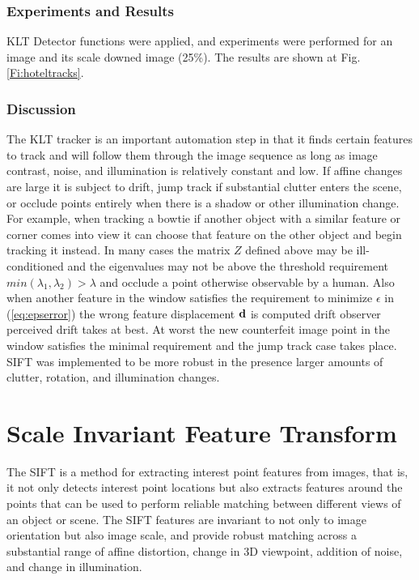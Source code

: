 \documentclass{article}
\begin{document}
\subsubsection{Experiments and Results}

KLT Detector functions were applied, and experiments were performed for an image and its scale downed image (25\%).
The results are shown at Fig. \ref{Fi:hoteltracks}. 

\subsubsection{Discussion}
The KLT tracker is an important automation step in that it finds certain features to track and will follow them through the image sequence as long as image contrast, noise, and illumination is relatively constant and low.  If affine changes are large it is subject to drift, jump track if substantial clutter enters the scene, or occlude points entirely when there is a shadow or other illumination change.  For example, when tracking a bowtie if another object with a similar feature or corner comes into view it can choose that feature on the other object and begin tracking it instead. In many cases the matrix $Z$ defined above may be ill-conditioned and the eigenvalues may not be above the threshold requirement $min(\lambda_1,\lambda_2) > \lambda$ and occlude a point otherwise  observable by a human.  Also when another feature in the window satisfies the requirement to minimize $\epsilon$ in (\ref{eq:epserror}) the wrong feature displacement $\bf d$ is computed drift observer perceived drift takes at best. At worst the new counterfeit image point in the window satisfies the minimal requirement and the jump track case takes place.  SIFT was implemented to be more robust in the presence larger amounts of clutter, rotation, and illumination changes. 

\section{Scale Invariant Feature Transform}\label{S:SIFT}

The SIFT \cite{dLowe04} is a method for extracting interest point features from images, that is, 
it not only detects interest point locations but also extracts features around the points that can be used to perform reliable matching between different views of an object or scene. 
The SIFT features are invariant to not only to image orientation but also image scale, and provide robust matching across a substantial range of affine distortion, change in 3D viewpoint, addition of noise, and change in illumination. 
\end{document}
